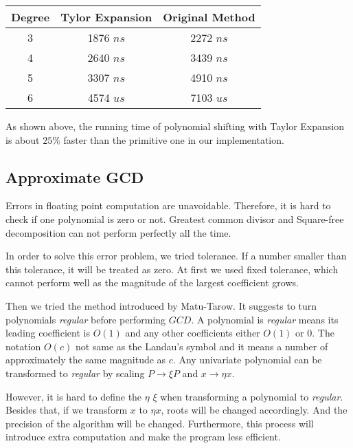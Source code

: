 \begin{center}
\label{tb1}
\begin{tabular}{ |c|c|c| } 
 \hline

 Degree  & Tylor Expansion   & Original Method\\ 

 \hline
 3   & 1876 $ns$  & 2272 $ns$\\ 
 4   & 2640 $ns$  & 3439 $ns$\\ 
 5   & 3307 $ns$  & 4910 $ns$\\ 
 6   & 4574 $us$  & 7103 $us$\\ 
 \hline
\end{tabular}
\end{center}

As shown above, the running time of polynomial shifting with Taylor Expansion is
about $25\%$  faster than the primitive one in our implementation.

\subsection{Approximate GCD}

Errors in floating point computation are unavoidable. Therefore, it is hard to
check if one polynomial is zero or not. Greatest common divisor and Square-free
decomposition can not perform perfectly all the time.

In order to solve this error problem, we tried tolerance. If a number
smaller than this tolerance, it will be treated as zero. At first we used fixed
tolerance, which cannot perform well as the magnitude of the largest coefficient
grows.

Then we tried the method introduced by Matu-Tarow\cite{Approximate}. It suggests
to turn polynomials \textit{regular} before performing $GCD$. A polynomial is
\textit{regular} means its leading coefficient is $O(1)$ and any other
coefficients either $O(1)$ or $0$. The notation $O(c)$ not same as the Landau’s
symbol and it means a number of approximately the same magnitude as $c$. Any
univariate polynomial can be transformed to \textit{regular} by scaling
$P\rightarrow \xi P $ and $x \rightarrow  \eta x$. 

However, it is hard to define the $\eta$ $\xi$ when transforming a
polynomial to \textit{regular}. Besides that, if we transform $x$ to $\eta x$,
roots will be changed accordingly. And the precision of the algorithm will be
changed. Furthermore, this process will introduce extra computation and make the
program less efficient.

